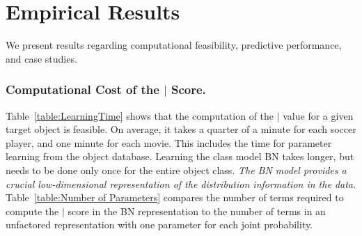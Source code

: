 										\section{Empirical Results}
										
										We present results regarding computational feasibility, 
										predictive performance, and case studies.
										
										\subsubsection{Computational Cost of the $\mid$ Score.}
										Table~\ref{table:LearningTime} shows that the computation of the $\mid$ value for a given target object is feasible. On average, it takes a quarter of a minute for each soccer player, and one minute for each movie. This includes the time for parameter learning from the object database.
										Learning the class model BN takes longer, but needs to be done only once for the entire object class. 
										{\em The BN model 
											provides a crucial %
											low-dimensional representation of the 
											distribution information in the data.} Table~\ref{table:Number of Parameters} compares the number of terms required to compute the $\mid$ score in the BN representation to the number of terms in an unfactored representation with one parameter for each joint probability.
										
